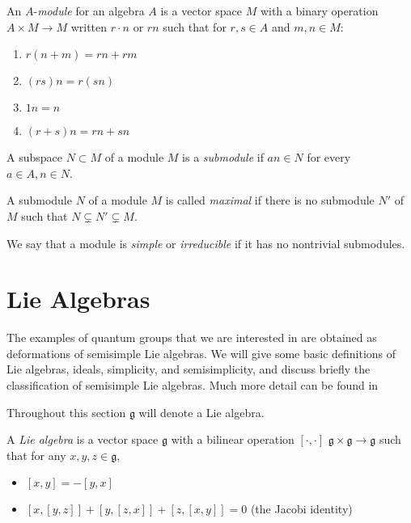 \begin{defn}
    An $A$-\emph{module} for an algebra $A$ is a vector space $M$ with a binary
    operation $A \times M \to M$ written $r\cdot n$ or $rn$ such that for $r,s \in A$ and $m,n \in M$:

    \begin{enumerate}
        \item $r(n + m) = rn + rm$
        \item $(rs)n = r(sn)$
        \item $1n = n$
        \item $(r+s)n = rn + sn$
    \end{enumerate}
\end{defn}

\begin{defn}
    A subspace $N \subset M$ of a module $M$ is a \emph{submodule} if $an \in N$ for every $a \in A, n\in N$.
\end{defn}

\begin{defn}
    A submodule $N$ of a module $M$ is called \emph{maximal} if there is no submodule $N'$ of $M$ such that $N \subsetneq N' \subsetneq M$.
\end{defn}

\begin{defn}
    We say that a module is \emph{simple} or \emph{irreducible} if it has no nontrivial submodules.
\end{defn}

\section{Lie Algebras}

The examples of quantum groups that we are interested in are obtained as
deformations of semisimple Lie algebras. We will give some basic definitions of
Lie algebras, ideals, simplicity, and semisimplicity, and discuss briefly the
classification of semisimple Lie algebras. Much more detail can be found in
\cite{Humphreys1973}

Throughout this section $\mathfrak{g}$ will denote a Lie algebra.

A \emph{Lie algebra} is a vector space $\mathfrak{g}$ with a bilinear operation
$\left[ \cdot, \cdot \right]$  $\mathfrak{g} \times \mathfrak{g} \to
\mathfrak{g}$ such that for any $x,y,z\in \mathfrak{g}$,

\begin{itemize}
    \item $\left[ x,y \right] = -\left[ y,x \right]$
    \item $\left[ x, \left[ y,z \right] \right] + \left[ y, \left[ z,x \right] \right] + \left[ z, \left[ x,y \right] \right] = 0$ (the Jacobi identity)
\end{itemize}

